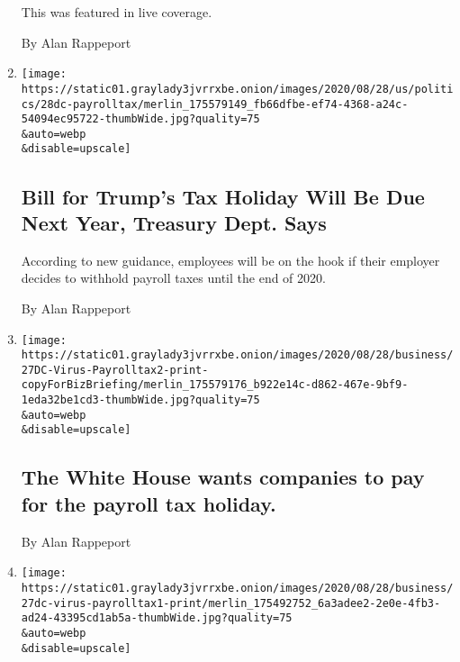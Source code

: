 \begin{enumerate}
  This was featured in live coverage.

  By Alan Rappeport
\item
  \href{/2020/08/28/us/politics/trump-tax-holiday-bill-due.html}{}

  \texttt{[image: https://static01.graylady3jvrrxbe.onion/images/2020/08/28/us/politics/28dc-payrolltax/merlin\_175579149\_fb66dfbe-ef74-4368-a24c-54094ec95722-thumbWide.jpg?quality=75\\\&auto=webp\\\&disable=upscale]}

  \hypertarget{bill-for-trumps-tax-holiday-will-be-due-next-year-treasury-dept-says}{%
  \subsection{Bill for Trump's Tax Holiday Will Be Due Next Year,
  Treasury Dept.
  Says}\label{bill-for-trumps-tax-holiday-will-be-due-next-year-treasury-dept-says}}

  According to new guidance, employees will be on the hook if their
  employer decides to withhold payroll taxes until the end of 2020.

  By Alan Rappeport
\item
  \href{/2020/08/28/business/the-white-house-wants-companies-to-pay-for-the-payroll-tax-holiday.html}{}

  \texttt{[image: https://static01.graylady3jvrrxbe.onion/images/2020/08/28/business/27DC-Virus-Payrolltax2-print-copyForBizBriefing/merlin\_175579176\_b922e14c-d862-467e-9bf9-1eda32be1cd3-thumbWide.jpg?quality=75\\\&auto=webp\\\&disable=upscale]}

  \hypertarget{the-white-house-wants-companies-to-pay-for-the-payroll-tax-holiday}{%
  \subsection{The White House wants companies to pay for the payroll tax
  holiday.}\label{the-white-house-wants-companies-to-pay-for-the-payroll-tax-holiday}}

  By Alan Rappeport
\item
  \href{/2020/08/27/us/politics/trump-payroll-tax-coronavirus.html}{}

  \texttt{[image: https://static01.graylady3jvrrxbe.onion/images/2020/08/28/business/27dc-virus-payrolltax1-print/merlin\_175492752\_6a3adee2-2e0e-4fb3-ad24-43395cd1ab5a-thumbWide.jpg?quality=75\\\&auto=webp\\\&disable=upscale]}

  \hypertarget{white-house-wants-companies-to-foot-payroll-tax-bill-for-workers}{%
}
\end{enumerate}
